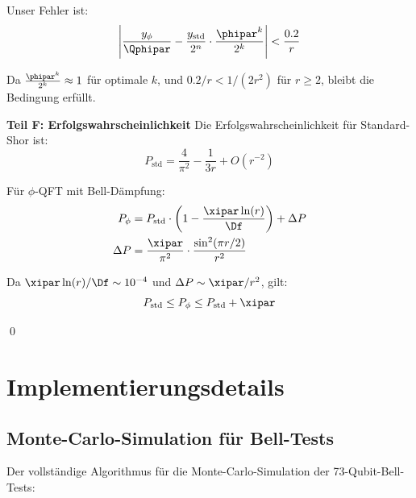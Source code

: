 Unser Fehler ist:
\[
\left| \frac{y_{\phi}}{\Qphipar} - \frac{y_{\text{std}}}{2^n} \cdot \frac{\phipar^k}{2^k} \right| < \frac{0.2}{r}
\]

Da $\frac{\phipar^k}{2^k} \approx 1$ für optimale $k$, und $0.2/r < 1/(2r^2)$ für $r \geq 2$, bleibt die Bedingung erfüllt.

\textbf{Teil F: Erfolgswahrscheinlichkeit}
Die Erfolgswahrscheinlichkeit für Standard-Shor ist:
\[
P_{\text{std}} = \frac{4}{\pi^2} - \frac{1}{3r} + O(r^{-2})
\]

Für $\phi$-QFT mit Bell-Dämpfung:
\begin{align*}
	P_{\phi} &= P_{\text{std}} \cdot \left(1 - \frac{\xipar \ln(r)}{\Df}\right) + \Delta P \\
	\Delta P &= \frac{\xipar}{\pi^2} \cdot \frac{\sin^2(\pi r/2)}{r^2}
\end{align*}

Da $\xipar \ln(r)/\Df \sim 10^{-4}$ und $\Delta P \sim \xipar/r^2$, gilt:
\[
P_{\text{std}} \leq P_{\phi} \leq P_{\text{std}} + \xipar
\]

\qed

\section{Implementierungsdetails}
\label{app:implementation}

\subsection{Monte-Carlo-Simulation für Bell-Tests}
\label{app:monte_carlo}

Der vollständige Algorithmus für die Monte-Carlo-Simulation der 73-Qubit-Bell-Tests:

